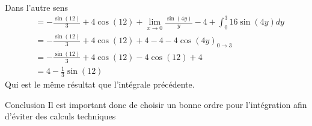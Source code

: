 \begin{parag}{Dans l'autre sens}
\begin{align*}
            &= -\frac{\sin\left(12\right)}{3} + 4\cos\left(12\right) + \lim_{x \to 0} \frac{\sin\left(4y\right)}{y} - 4 + \int_0^3 16\sin\left(4y\right)dy\\
            &= -\frac{\sin\left(12\right)}{3} + 4\cos\left(12\right) + 4 - 4 -4\cos\left(4y\right)_{0 \to 3}\\
            &= -\frac{\sin\left(12\right)}{3} + 4\cos\left(12\right) - 4 \cos\left(12\right) + 4\\
            &= 4- \frac{1}{3}\sin\left(12\right)
    \end{align*}
    Qui est le même résultat que l'intégrale précédente.
    
    \begin{subparag}{Conclusion}
        Il est important donc de choisir un bonne ordre pour l'intégration afin d'éviter des calculs techniques
    \end{subparag}
\end{parag}


